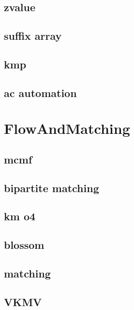 \subsection{zvalue}

\subsection{suffix array}

\subsection{kmp}

\subsection{ac automation}


\section{FlowAndMatching}
\subsection{mcmf}

\subsection{bipartite matching}

\subsection{km o4}

\subsection{blossom}

\subsection{matching}

\subsection{VKMV}

